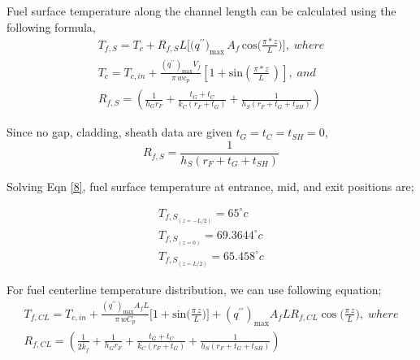 \documentclass[12pt]{article}
\begin{document}
Fuel surface temperature along the channel length can be calculated using the following formula,
\begin{equation}\label{8}
    \begin{gathered}
        T_{f,S}=T_{c}+R_{f,S}L\biggl[\biggl({q}^{\prime \prime}\biggr)_{\mathrm{max}}\,{A}_{f}\,\mathrm{cos}\biggl(\frac{\pi*z}{L}\biggr)\biggr] , \; where \\
        T_c = T_{c,i n}+\frac{\left(q^{\prime \prime}\right)_{\mathrm{max}}V_{f}}{\pi\,w c_{p}}\left[1+\mathrm{sin}\left(\frac{\pi*z}{L}\,\right)\right], \; and \\
        R_{f,S}=\left(\frac{1}{h_{G}r_{F}}+\frac{t_{G}+t_{C}}{k_{C}\left(r_{F}+t_{G}\right)}+\frac{1}{h_{S}\left(r_{F}+t_{G}+t_{S H}\right)}\right)
    \end{gathered}
\end{equation}

Since no gap, cladding, sheath data are given $t_G = t_C = t_{SH} = 0$, 
\begin{equation*}
    R_{f,S}={\frac{1}{h_{S}(r_{F}+t_{G}+t_{S H})}}
\end{equation*}

Solving Eqn \ref{8}, fuel surface temperature at entrance, mid, and exit positions are;
\begin{tcolorbox}
\begin{equation*}
    \begin{gathered}
        T_{{f, S}_{(z=-L/2)}} = 65 ^{\circ}c \\
        T_{{f, S}_{(z=0)}} = 69.3644 ^{\circ}c \\
        T_{{f, S}_{(z=L/2)}} = 65.458 ^{\circ}c
    \end{gathered}
\end{equation*}

\end{tcolorbox}
For fuel centerline temperature distribution, we can use following equation;
\begin{equation}\label{9}
    \begin{gathered}
        T_{f,C L}=T_{c,i n}+\frac{\left(q^{\prime \prime}\right)_{\mathrm{max}}A_{f}L}{\pi\,w C_{p}}\Bigg[1+\mathrm{sin}\Bigg(\frac{\pi\,z}{L}\Bigg)\Bigg]+\left(q^{\prime \prime}\right)_{\mathrm{max}}A_{f}L R_{f,C L}\cos\Bigg(\frac{\pi\,z}{L}\Bigg) , \; where \\
        R_{f,C L}=\left(\frac{1}{2\overline{{{k}}}_{f}}+\frac{1}{h_{G}r_{F}}+\frac{t_{G}+t_{C}}{k_{C}\left(r_{F}+t_{G}\right)}+\frac{1}{h_{S}\left(r_{F}+t_{G}+t_{S H}\right)}\right)
    \end{gathered}
\end{equation}
\end{document}

